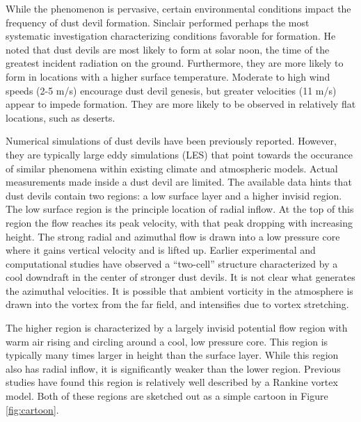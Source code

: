 While the phenomenon is pervasive, certain 
environmental conditions impact the frequency of dust devil formation.
Sinclair\cite{Sinclair1969} performed perhaps the most 
systematic investigation characterizing conditions favorable for
formation. He noted that dust devils are most
likely to form at solar noon, the time of the greatest incident radiation 
on the ground. Furthermore, they are more likely to form in locations 
with a higher surface temperature. Moderate to high wind speeds (2-5
m/s) encourage dust devil genesis, but greater velocities (11 m/s)
appear to impede formation. They are more likely to be observed in
relatively flat locations, such as deserts.  

Numerical simulations of dust devils have been previously
reported. However, they are typically large eddy simulations (LES) that point
towards the occurance of similar phenomena within existing climate and
atmospheric models\cite{QJ:QJ200513160722,doi:10.3137/ao.420105}. Actual
measurements made inside a dust devil 
are limited. The available data hints that dust devils contain
two regions: a low surface layer and a higher invisid region. The
low surface region is the  principle location of radial inflow. 
At the top of this region the flow 
reaches its peak velocity, with that peak dropping with increasing height. 
The strong radial and azimuthal flow is drawn into a low pressure core 
where it gains vertical velocity and is lifted up. Earlier experimental and 
computational studies have observed a ``two-cell'' structure
characterized by a cool downdraft in the center of stronger dust
devils\cite{doi:10.3137/ao.420105,Sinclair1973}. It is not clear what
generates the azimuthal velocities. It is possible that ambient
vorticity in the atmosphere is drawn into the vortex from the far field,
and intensifies due to vortex stretching.  

The higher region is characterized by a largely invisid potential flow
region with warm air rising and circling around a cool, low pressure
core. This region is typically many times larger in height than the
surface layer. While this region also has radial inflow, it is
significantly weaker than the lower region. Previous studies have found
this region is relatively well described by a Rankine vortex
model\cite{Sinclair1973}. Both of these regions are sketched out as a 
simple cartoon in Figure \ref{fig:cartoon}.

